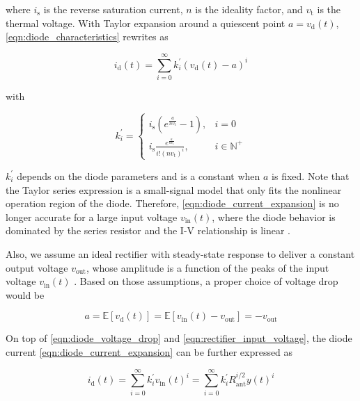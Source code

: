 where ${i_{\text{s}}}$ is the reverse saturation current, $n$ is the ideality factor, and ${{v_{\text{t}}}}$ is the thermal voltage. With Taylor expansion around a quiescent point $a = {v_{\text{d}}}(t)$, \eqref{eqn:diode_characteristics} rewrites as

\begin{equation}\label{eqn:diode_current_expansion}
  {i_{\text{d}}}(t) = \sum\limits_{i = 0}^\infty  {k_i^\prime } {\left( {{v_{\text{d}}}(t) - a} \right)^i}
\end{equation}

with

\begin{equation}\label{eqn:diode_k_prime}
  k_i^\prime  = \left\{ {
  \begin{array}{*{20}{c}}
    {{i_{\text{s}}}\left( {{e^{\frac{a}{{n{v_{\text{t}}}}}}} - 1} \right),}&{i = 0} \\
    {{i_{\text{s}}}\frac{{{e^{\frac{a}{{n{v_{\text{t}}}}}}}}}{{i!{{\left( {n{v_{\text{t}}}} \right)}^i}}},}&{i \in {\mathbb{N}^ + }}
  \end{array}} \right.
\end{equation}


$k_i^\prime $ depends on the diode parameters and is a constant when $a$ is fixed. Note that the Taylor series expression is a small-signal model that only fits the nonlinear operation region of the diode. Therefore, \eqref{eqn:diode_current_expansion} is no longer accurate for a large input voltage ${v_{{\text{in}}}}(t)$, where the diode behavior is dominated by the series resistor and the I-V relationship is linear \cite{Boaventura2013}.

Also, we assume an ideal rectifier with steady-state response to deliver a constant output voltage ${v_{{\text{out}}}}$, whose amplitude is a function of the peaks of the input voltage ${v_{{\text{in}}}}(t)$ \cite{Curty2005}. Based on those assumptions, a proper choice of voltage drop would be

\begin{equation}\label{eqn:diode_voltage_drop}
  a = \mathbb{E}\left[ {{v_{\text{d}}}(t)} \right] = \mathbb{E}\left[ {{v_{{\text{in}}}}(t) - {v_{{\text{out}}}}} \right] =  - {v_{{\text{out}}}}
\end{equation}

On top of \eqref{eqn:diode_voltage_drop} and \eqref{eqn:rectifier_input_voltage}, the diode current \eqref{eqn:diode_current_expansion} can be further expressed as

\begin{equation}\label{eqn:diode_current}
  {i_{\text{d}}}(t) = \sum\limits_{i = 0}^\infty  {k_i^\prime } {v_{{\text{in}}}}{(t)^i} = \sum\limits_{i = 0}^\infty  {k_i^\prime } R_{{\text{ant}}}^{i/2}y{(t)^i}
\end{equation}

